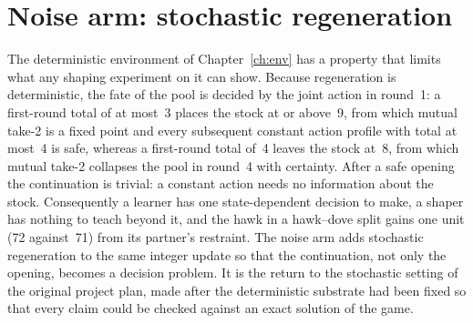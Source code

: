 %
%

\section{Noise arm: stochastic regeneration}
\label{sec:noise-arm}

The deterministic environment of Chapter~\ref{ch:env} has a property that
limits what any shaping experiment on it can show.
Because regeneration is deterministic, the fate of the pool is decided by
the joint action in round~1: a first-round total of at most~3 places the
stock at or above~9, from which mutual take-2 is a fixed point and every
subsequent constant action profile with total at most~4 is safe, whereas a
first-round total of~4 leaves the stock at~8, from which mutual take-2
collapses the pool in round~4 with certainty.
After a safe opening the continuation is trivial: a constant action needs no
information about the stock.
Consequently a learner has one state-dependent decision to make, a shaper
has nothing to teach beyond it, and the hawk in a hawk--dove split gains
one unit (72 against~71) from its partner's restraint.
The noise arm adds stochastic regeneration to the same integer update so
that the continuation, not only the opening, becomes a decision problem.
It is the return to the stochastic setting of the original project plan,
made after the deterministic substrate had been fixed so that every claim
could be checked against an exact solution of the game.


